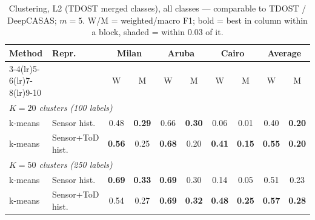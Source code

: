 \begin{table}[H]
\centering\small
\caption{Clustering, L2 (TDOST merged classes), all classes --- comparable to TDOST / DeepCASAS; $m=5$. W/M = weighted/macro F1; bold = best in column within a block, shaded = within 0.03 of it.}
\label{tab:clu_l2_all_m5}
\setlength{\tabcolsep}{3.5pt}
\begin{tabular}{llcc|cc|cc|cc}
\toprule
Method & Repr. & \multicolumn{2}{c}{Milan} & \multicolumn{2}{c}{Aruba} & \multicolumn{2}{c}{Cairo} & \multicolumn{2}{c}{Average} \\
\cmidrule(lr){3-4}\cmidrule(lr){5-6}\cmidrule(lr){7-8}\cmidrule(lr){9-10}
 & & W & M & W & M & W & M & W & M \\
\midrule
\multicolumn{10}{l}{\textit{$K = 20$ clusters (100 labels)}} \\
\midrule
k-means & Sensor hist. & 0.48 & \cellcolor{blue!12}\textbf{0.29} & \cellcolor{blue!12}0.66 & \cellcolor{blue!12}\textbf{0.30} & 0.06 & 0.01 & 0.40 & \cellcolor{blue!12}\textbf{0.20} \\
k-means & Sensor+ToD hist. & \cellcolor{blue!12}\textbf{0.56} & 0.25 & \cellcolor{blue!12}\textbf{0.68} & 0.20 & \cellcolor{blue!12}\textbf{0.41} & \cellcolor{blue!12}\textbf{0.15} & \cellcolor{blue!12}\textbf{0.55} & \cellcolor{blue!12}\textbf{0.20} \\
\midrule
\multicolumn{10}{l}{\textit{$K = 50$ clusters (250 labels)}} \\
\midrule
k-means & Sensor hist. & \cellcolor{blue!12}\textbf{0.69} & \cellcolor{blue!12}\textbf{0.33} & \cellcolor{blue!12}\textbf{0.69} & \cellcolor{blue!12}0.30 & 0.14 & 0.05 & 0.51 & 0.23 \\
k-means & Sensor+ToD hist. & 0.54 & 0.27 & \cellcolor{blue!12}\textbf{0.69} & \cellcolor{blue!12}\textbf{0.32} & \cellcolor{blue!12}\textbf{0.48} & \cellcolor{blue!12}\textbf{0.25} & \cellcolor{blue!12}\textbf{0.57} & \cellcolor{blue!12}\textbf{0.28} \\
\bottomrule
\end{tabular}
\end{table}
